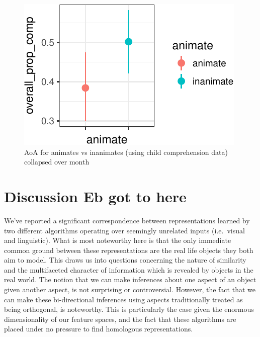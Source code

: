 \documentclass[10pt, letterpaper]{article}
\newenvironment{CodeChunk}{}{}
\begin{document}
\begin{CodeChunk}
\begin{figure}[tb]
\includegraphics{figs/animacy-aoa-comp-graph-1} \caption[AoA for animates vs inanimates (using child comprehension data) collapsed over month]{AoA for animates vs inanimates (using child comprehension data) collapsed over month}\label{fig:animacy-aoa-comp-graph}
\end{figure}
\end{CodeChunk}

\section{\texorpdfstring{Discussion \textbf{Eb got to
here}}{Discussion Eb got to here}}\label{discussion-eb-got-to-here}

We've reported a significant correspondence between representations
learned by two different algorithms operating over seemingly unrelated
inputs (i.e.~visual and linguistic). What is most noteworthy here is
that the only immediate common ground between these representations are
the real life objects they both aim to model. This draws us into
questions concerning the nature of similarity and the multifaceted
character of information which is revealed by objects in the real world.
The notion that we can make inferences about one aspect of an object
given another aspect, is not surprising or controversial. However, the
fact that we can make these bi-directional inferences using aspects
traditionally treated as being orthogonal, is noteworthy. This is
particularly the case given the enormous dimensionality of our feature
spaces, and the fact that these algorithms are placed under no pressure
to find homologous representations.
\end{document}
